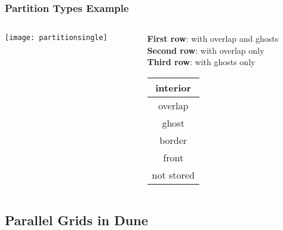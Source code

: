 \begin{frame}[fragile]
\frametitle{Partition Types Example}
\begin{columns}[c]
\begin{column}{0.75\textwidth}

\texttt{[image: partitionsingle]}
\end{column}
\begin{column}{0.25\textwidth}
\vskip0.5cm
\textbf{First row}: with overlap and ghosts\\
\textbf{Second row}: with overlap only\\
\textbf{Third row}: with ghosts only
\vskip5mm
\begin{center}
\begin{tabular}{|c|}
\hline\color{red} interior\\\hline
\color{green} overlap\\\hline
\color{yellow} ghost\\\hline
\color{blue} border\\\hline
\color{magenta} front\\\hline
\color{gray} not stored\\\hline
\end{tabular}
\end{center}
\end{column}
\end{columns}

\end{frame}

\subsection{Parallel Grids in Dune}

